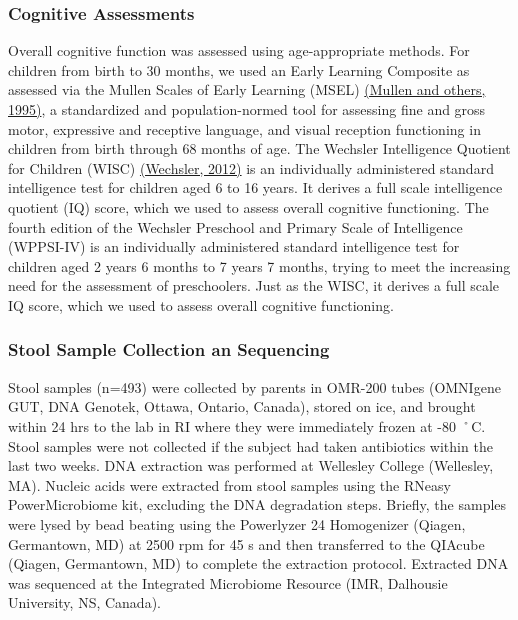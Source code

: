 \documentclass[a4paper]{article}
\begin{document}
\subsubsection{Cognitive Assessments}

Overall cognitive function was assessed using age-appropriate methods.
For children from birth to 30 months, we used an Early Learning
Composite as assessed via the Mullen Scales of Early Learning (MSEL)
\href{https://www.zotero.org/google-docs/?NSyykd}{(Mullen and others,
1995)}, a standardized and population-normed tool for assessing fine and
gross motor, expressive and receptive language, and visual reception
functioning in children from birth through 68 months of age. The
Wechsler Intelligence Quotient for Children (WISC)
\href{https://www.zotero.org/google-docs/?OopdA1}{(Wechsler, 2012)} is
an individually administered standard intelligence test for children
aged 6 to 16 years. It derives a full scale intelligence quotient (IQ)
score, which we used to assess overall cognitive functioning. The fourth
edition of the Wechsler Preschool and Primary Scale of Intelligence
(WPPSI-IV) is an individually administered standard intelligence test
for children aged 2 years 6 months to 7 years 7 months, trying to meet
the increasing need for the assessment of preschoolers. Just as the
WISC, it derives a full scale IQ score, which we used to assess overall
cognitive functioning.

\subsubsection{Stool Sample Collection an
Sequencing}

Stool samples (n=493) were collected by parents in OMR-200 tubes
(OMNIgene GUT, DNA Genotek, Ottawa, Ontario, Canada), stored on ice, and
brought within 24 hrs to the lab in RI where they were immediately
frozen at -80 ˚C. Stool samples were not collected if the subject had
taken antibiotics within the last two weeks. DNA extraction was
performed at Wellesley College (Wellesley, MA). Nucleic acids were
extracted from stool samples using the RNeasy PowerMicrobiome kit,
excluding the DNA degradation steps. Briefly, the samples were lysed by
bead beating using the Powerlyzer 24 Homogenizer (Qiagen, Germantown,
MD) at 2500 rpm for 45 s and then transferred to the QIAcube (Qiagen,
Germantown, MD) to complete the extraction protocol. Extracted DNA was
sequenced at the Integrated Microbiome Resource (IMR, Dalhousie
University, NS, Canada).
\end{document}
